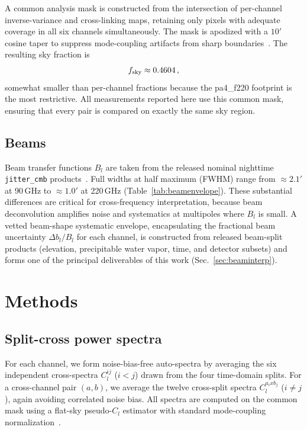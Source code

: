 \documentclass[twocolumn,showpacs,preprintnumbers,amsmath,amssymb,floatfix,prd]{revtex4-2}
\def\ell{l}%
\def\times{x}%
\begin{document}
A common analysis mask is constructed from the intersection of per-channel
inverse-variance and cross-linking maps, retaining only pixels with
adequate coverage in all six channels simultaneously.  The mask is apodized
with a $10'$ cosine taper to suppress mode-coupling artifacts from sharp
boundaries~\cite{Hivon2002}.  The resulting sky fraction is
\begin{equation}
f_{\rm sky} \approx 0.4604\,,
\end{equation}
somewhat smaller than per-channel fractions because the pa4\_f220
footprint is the most restrictive.  All measurements reported here use this
common mask, ensuring that every pair is compared on exactly the same sky
region.

\subsection{Beams}\label{sec:beams}

Beam transfer functions $B_\ell$ are taken from the released nominal
nighttime \texttt{jitter\_cmb} products~\cite{Naess2025}.  Full widths at
half maximum (FWHM) range from $\approx\!2.1'$ at 90\,GHz to
$\approx\!1.0'$ at 220\,GHz (Table~\ref{tab:beamenvelope}).  These
substantial differences are critical for cross-frequency interpretation,
because beam deconvolution amplifies noise and systematics at multipoles
where $B_\ell$ is small.  A vetted beam-shape systematic envelope,
encapsulating the fractional beam uncertainty $\Delta b_\ell/B_\ell$ for
each channel, is constructed from released beam-split products (elevation,
precipitable water vapor, time, and detector subsets) and forms one of the
principal deliverables of this work (Sec.~\ref{sec:beaminterp}).

\section{Methods}\label{sec:methods}

\subsection{Split-cross power spectra}\label{sec:splitcross}

For each channel, we form noise-bias-free auto-spectra by averaging the
six independent cross-spectra $C_\ell^{ij}$ ($i<j$) drawn from the four
time-domain splits.  For a cross-channel pair $(a,b)$, we average the
twelve cross-split spectra $C_\ell^{a_i\times b_j}$ ($i\neq j$), again
avoiding correlated noise bias.  All spectra are computed on the common
mask using a flat-sky pseudo-$C_\ell$ estimator with standard
mode-coupling normalization~\cite{Hivon2002,Tristram2005,Alonso2019}.
\end{document}
